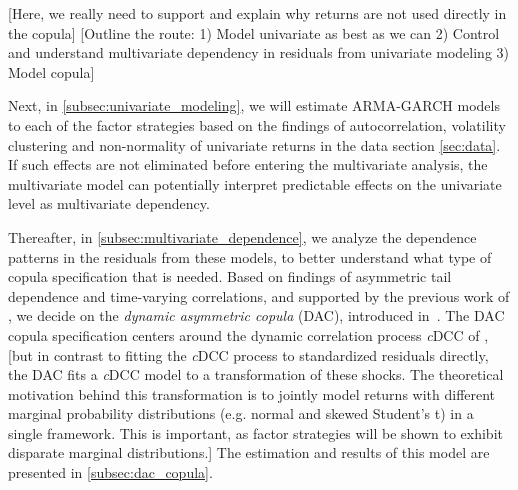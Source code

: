 
[Here, we really need to support and explain why returns are not used directly in the copula]
[Outline the route: 1) Model univariate as best as we can 2) Control and understand multivariate dependency in residuals from univariate modeling 3) Model copula]

Next, in \autoref{subsec:univariate_modeling}, we will estimate ARMA-GARCH models to each of the factor strategies based on the findings of autocorrelation, volatility clustering and non-normality of univariate returns in the data section \autoref{sec:data}. If such effects are not eliminated before entering the multivariate analysis, the multivariate model can potentially interpret predictable effects on the univariate level as multivariate dependency. 

Thereafter, in \autoref{subsec:multivariate_dependence}, we analyze the dependence patterns in the residuals from these models, to better understand what type of copula specification that is needed. Based on findings of asymmetric tail dependence and time-varying correlations, and supported by the previous work of \textcite{ChristoffersenLanglois2013}, we decide on the \emph{dynamic asymmetric copula} (DAC), introduced in~\autocite{ChristoffersenErrunzaJacobLanglois2012}. The DAC copula specification centers around the dynamic correlation process \textit{c}DCC of \textcite{Aielli2013}, [but in contrast to fitting the \emph{c}DCC process to standardized residuals directly, the DAC fits a \emph{c}DCC model to a transformation of these shocks. The theoretical motivation behind this transformation is to jointly model returns with different marginal probability distributions (e.g. normal and skewed Student's t) in a single framework. This is important, as factor strategies will be shown to exhibit disparate marginal distributions.] The estimation and results of this model are presented in \autoref{subsec:dac_copula}.

